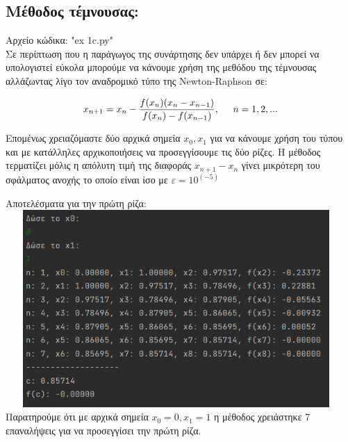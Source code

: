\documentclass{article}
\begin{document}
\subsection{Μέθοδος τέμνουσας: }

Αρχείο κώδικα: "ex 1c.py" \\

Σε περίπτωση που η παράγωγος της συνάρτησης δεν υπάρχει ή δεν μπορεί να υπολογιστεί εύκολα μπορούμε να κάνουμε χρήση της μεθόδου της τέμνουσας αλλάζωντας λίγο τον αναδρομικό τύπο της Newton-Raphson σε:

\[x_{n+1} = x_n - \frac{f(x_n)(x_n - x_{n-1})}{f(x_n) - f(x_{n-1})} , \hspace{0.5cm} n = 1, 2, ...\]

Επομένως χρειαζόμαστε δύο αρχικά σημεία \(x_0, x_1\) για να κάνουμε χρήση του τύπου και με κατάλληλες αρχικοποιήσεις να προσεγγίσουμε τις δύο ρίζες. Η μέθοδος τερματίζει μόλις η απόλυτη τιμή της διαφοράς \(x_{n+1} - x_{n}\) γίνει μικρότερη του σφάλματος ανοχής το οποίο είναι ίσο με \(ε = 10^{(-5)}\)

\pagebreak
Αποτελέσματα για την πρώτη ρίζα: \vspace{3mm} \\
\includegraphics[width=13cm, height=7.5cm]{images/results_5.png} \\

Παρατηρούμε ότι με αρχικά σημεία \(x_0 = 0, x_1 = 1\) η μέθοδος χρειάστηκε 7 επαναλήψεις για να προσεγγίσει την πρώτη ρίζα. \\ 
\end{document}
